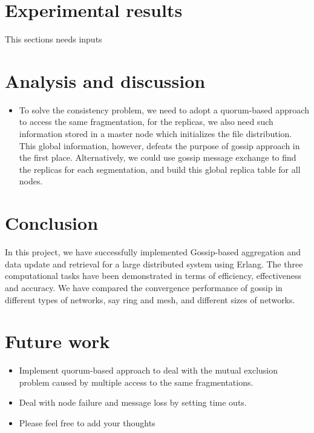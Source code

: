 \documentclass[12pt, conference, compsocconf]{IEEEtran}
\begin{document}
\section{Experimental results} 
\indent This sections needs inputs
\section{Analysis and discussion}
\begin{itemize}
	\item To solve the consistency problem, we need to adopt a quorum-based approach to access the same fragmentation, for the replicas, we also need such information stored in a master node which initializes the file distribution. This global information, however, defeats the purpose of gossip approach in the first place. Alternatively, we could use gossip message exchange to find the replicas for each segmentation, and build this global replica table for all nodes.  
\end{itemize}
\section{Conclusion}
\indent In this project, we have successfully implemented Gossip-based aggregation and data update and retrieval for a large distributed system using Erlang. The three computational tasks have been demonstrated in terms of efficiency, effectiveness and accuracy. We have compared the convergence performance of gossip in different types of networks, say ring and mesh, and different sizes of networks. 

\section{Future work}
\begin{itemize}
	\item Implement quorum-based approach to deal with the mutual exclusion problem caused by multiple access to the same fragmentations. 
	\item Deal with node failure and message loss by setting time outs. 
	\item Please feel free to add your thoughts
\end{itemize}



\end{document}
